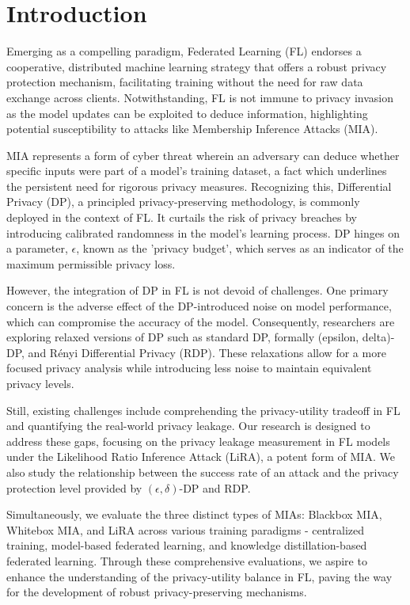 \section{Introduction}

Emerging as a compelling paradigm, Federated Learning (FL) endorses a cooperative, distributed machine learning strategy that offers a robust privacy protection mechanism, facilitating training without the need for raw data exchange across clients. Notwithstanding, FL is not immune to privacy invasion as the model updates can be exploited to deduce information, highlighting potential susceptibility to attacks like Membership Inference Attacks (MIA).

MIA represents a form of cyber threat wherein an adversary can deduce whether specific inputs were part of a model's training dataset, a fact which underlines the persistent need for rigorous privacy measures. Recognizing this, Differential Privacy (DP), a principled privacy-preserving methodology, is commonly deployed in the context of FL. It curtails the risk of privacy breaches by introducing calibrated randomness in the model's learning process. DP hinges on a parameter, $\epsilon$, known as the 'privacy budget', which serves as an indicator of the maximum permissible privacy loss.

However, the integration of DP in FL is not devoid of challenges. One primary concern is the adverse effect of the DP-introduced noise on model performance, which can compromise the accuracy of the model. Consequently, researchers are exploring relaxed versions of DP such as standard DP, formally (epsilon, delta)-DP, and Rényi Differential Privacy (RDP). These relaxations allow for a more focused privacy analysis while introducing less noise to maintain equivalent privacy levels.

Still, existing challenges include comprehending the privacy-utility tradeoff in FL and quantifying the real-world privacy leakage. Our research is designed to address these gaps, focusing on the privacy leakage measurement in FL models under the Likelihood Ratio Inference Attack (LiRA), a potent form of MIA. We also study the relationship between the success rate of an attack and the privacy protection level provided by $(\epsilon, \delta)$-DP and RDP.

Simultaneously, we evaluate the three distinct types of MIAs: Blackbox MIA, Whitebox MIA, and LiRA across various training paradigms - centralized training, model-based federated learning, and knowledge distillation-based federated learning. Through these comprehensive evaluations, we aspire to enhance the understanding of the privacy-utility balance in FL, paving the way for the development of robust privacy-preserving mechanisms.

